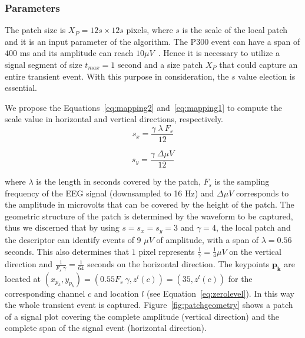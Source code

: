 \documentclass[utf8]{frontiersSCNS} %
\begin{document}
\subsubsection{Parameters}
\label{Parameters}

The patch size is $X_P = 12s \times 12s$ pixels, where $s$ is the scale of the local patch and it is an input parameter of the algorithm. The P300 event can have a span of $400$ ms and its amplitude can reach $ 10 \mu V $~\citep{Rao2013}.  Hence it is necessary to utilize a signal segment of size $t_{max} = 1$ second and a size patch $X_P$ that could capture an entire transient event. With this purpose in consideration, the $s$ value election is essential.

We propose the Equations~\ref{eq:mapping2} and~\ref{eq:mapping1} to compute the scale value in horizontal and vertical directions, respectively. 
\begin{equation}
s_x = \frac{ \gamma \;  \lambda \  F_s}{12}
\label{eq:mapping2}
\end{equation}

\begin{equation}
s_y= \frac{\gamma \; \Delta \mu V}{12} 
\label{eq:mapping1}
\end{equation}

\noindent where $ \lambda $ is the length in seconds covered by the patch, $ F_s $ is the sampling frequency of the EEG signal (downsampled to 16 Hz) and  $\Delta  \mu V $ corresponds to the amplitude in microvolts that can be covered by the height of the patch. The geometric structure of the patch is determined by the waveform to be captured, thus we discerned that by using $ s =s_x =s_y = 3 $ and $ \gamma = 4 $,  the local patch and the descriptor can identify events of 9 $ \mu V $ of amplitude, with a span of $ \lambda = 0.56$ seconds.  This also determines that $ 1 $ pixel represents $ \frac{1}{\gamma}= \frac{1}{4} \mu V $ on the vertical direction and $\frac{1}{F_s \ \gamma}=\frac{1}{64}$ seconds on the horizontal direction. The keypoints  $\mathbf{p_k}$  are located at $ (x_{p_k}, y_{p_k} )= ( 0.55 F_s \ \gamma, z^l(c) )= (35,  z^l(c)) $ for the corresponding channel $c$ and location $l$ (see Equation~\ref{eq:zerolevel}).   In this way the whole transient event is captured. 
Figure~\ref{fig:patchgeometry} shows a patch of a signal plot covering the complete amplitude (vertical direction) and the complete span of the signal event (horizontal direction). 
\end{document}
